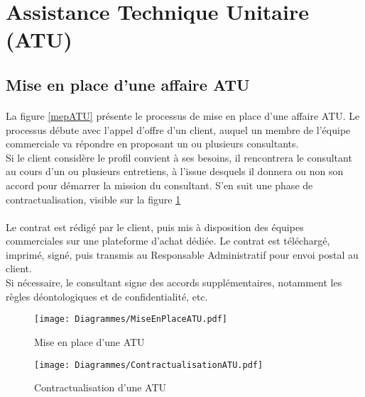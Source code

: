 \section{Assistance Technique Unitaire (ATU)}

\subsection{Mise en place d'une affaire ATU}

\paragraph{}La figure \ref{mepATU} présente le processus de mise en place d'une affaire ATU. Le processus débute avec l'appel d'offre d'un client, auquel un membre de l'équipe commerciale va répondre en proposant un ou plusieurs consultants.\\
Si le client considère le profil convient à ses besoins, il rencontrera le consultant au cours d'un ou plusieurs entretiens, à l'issue desquels il donnera ou non son accord pour démarrer la mission du consultant. S'en suit une phase de contractualisation, visible sur la figure \ref{contractATU}
\paragraph{} Le contrat est rédigé par le client, puis mis à disposition des équipes commerciales sur une plateforme d'achat dédiée. Le contrat est téléchargé, imprimé, signé, puis transmis au Responsable Administratif pour envoi postal au client.\\
Si nécessaire, le consultant signe des accords supplémentaires, notamment les règles déontologiques et de confidentialité, etc.

\begin{figure}[H!]
	\centering
	\texttt{[image: Diagrammes/MiseEnPlaceATU.pdf]}
	\caption{Mise en place d'une ATU} 
\end{figure}
\label{mepATU}
	
	
\begin{figure}[H!]
	\centering
	\texttt{[image: Diagrammes/ContractualisationATU.pdf]}
	\caption{Contractualisation d'une ATU} 
	\label{contractATU}
\end{figure}

